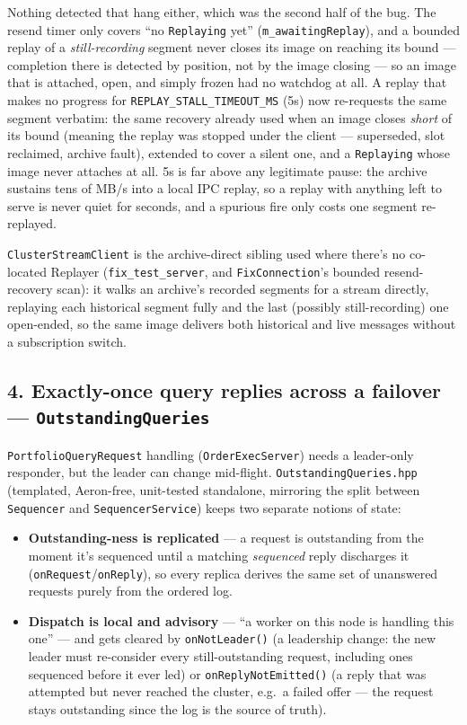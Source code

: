 \documentclass[
  10pt,
]{article}
\providecommand{\tightlist}{%
  \setlength{\itemsep}{0pt}\setlength{\parskip}{0pt}}
\begin{document}
Nothing detected that hang either, which was the second half of the bug.
The resend timer only covers ``no \texttt{Replaying} yet''
(\texttt{m\_awaitingReplay}), and a bounded replay of a
\emph{still-recording} segment never closes its image on reaching its
bound --- completion there is detected by position, not by the image
closing --- so an image that is attached, open, and simply frozen had no
watchdog at all. A replay that makes no progress for
\texttt{REPLAY\_STALL\_TIMEOUT\_MS} (5s) now re-requests the same
segment verbatim: the same recovery already used when an image closes
\emph{short} of its bound (meaning the replay was stopped under the
client --- superseded, slot reclaimed, archive fault), extended to cover
a silent one, and a \texttt{Replaying} whose image never attaches at
all. 5s is far above any legitimate pause: the archive sustains tens of
MB/s into a local IPC replay, so a replay with anything left to serve is
never quiet for seconds, and a spurious fire only costs one segment
re-replayed.

\texttt{ClusterStreamClient} is the
archive-direct sibling used where there's no co-located Replayer
(\texttt{fix\_test\_server}, and \texttt{FixConnection}'s bounded
resend-recovery scan): it walks an archive's recorded segments for a
stream directly, replaying each historical segment fully and the last
(possibly still-recording) one open-ended, so the same image delivers
both historical and live messages without a subscription switch.

\subsection{\texorpdfstring{4. Exactly-once query replies across a
failover ---
\texttt{OutstandingQueries}}{4. Exactly-once query replies across a failover --- OutstandingQueries}}\label{exactly-once-query-replies-across-a-failover-outstandingqueries}

\texttt{PortfolioQueryRequest} handling (\texttt{OrderExecServer}) needs
a leader-only responder, but the leader can change mid-flight.
\texttt{OutstandingQueries.hpp} (templated, Aeron-free, unit-tested
standalone, mirroring the split between \texttt{Sequencer} and
\texttt{SequencerService}) keeps two separate notions of state:

\begin{itemize}
\tightlist
\item
  \textbf{Outstanding-ness is replicated} --- a request is outstanding
  from the moment it's sequenced until a matching \emph{sequenced} reply
  discharges it (\texttt{onRequest}/\texttt{onReply}), so every replica
  derives the same set of unanswered requests purely from the ordered
  log.
\item
  \textbf{Dispatch is local and advisory} --- ``a worker on this node is
  handling this one'' --- and gets cleared by \texttt{onNotLeader()} (a
  leadership change: the new leader must re-consider every
  still-outstanding request, including ones sequenced before it ever
  led) or \texttt{onReplyNotEmitted()} (a reply that was attempted but
  never reached the cluster, e.g.~a failed offer --- the request stays
  outstanding since the log is the source of truth).
\end{itemize}
\end{document}
